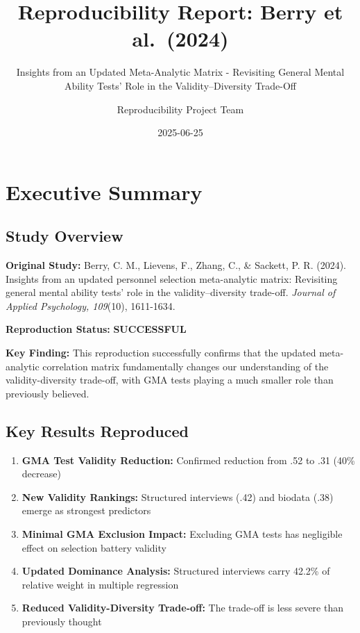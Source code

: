 \documentclass[
]{article}
\title{Reproducibility Report: Berry et al.~(2024)}
\subtitle{Insights from an Updated Meta-Analytic Matrix - Revisiting
General Mental Ability Tests' Role in the Validity--Diversity Trade-Off}
\author{Reproducibility Project Team}
\date{2025-06-25}
\providecommand{\tightlist}{%
  \setlength{\itemsep}{0pt}\setlength{\parskip}{0pt}}
\begin{document}
\maketitle

{
\setcounter{tocdepth}{2}
\tableofcontents
}
\section{Executive Summary}\label{executive-summary}

\subsection{Study Overview}\label{study-overview}

\textbf{Original Study:} Berry, C. M., Lievens, F., Zhang, C., \&
Sackett, P. R. (2024). Insights from an updated personnel selection
meta-analytic matrix: Revisiting general mental ability tests' role in
the validity--diversity trade-off. \emph{Journal of Applied Psychology,
109}(10), 1611-1634.

\textbf{Reproduction Status:} \textbf{SUCCESSFUL}

\textbf{Key Finding:} This reproduction successfully confirms that the
updated meta-analytic correlation matrix fundamentally changes our
understanding of the validity-diversity trade-off, with GMA tests
playing a much smaller role than previously believed.

\subsection{Key Results Reproduced}\label{key-results-reproduced}

\begin{enumerate}
\def\labelenumi{\arabic{enumi}.}
\tightlist
\item
  \textbf{GMA Test Validity Reduction:} Confirmed reduction from .52 to
  .31 (40\% decrease)
\item
  \textbf{New Validity Rankings:} Structured interviews (.42) and
  biodata (.38) emerge as strongest predictors
\item
  \textbf{Minimal GMA Exclusion Impact:} Excluding GMA tests has
  negligible effect on selection battery validity
\item
  \textbf{Updated Dominance Analysis:} Structured interviews carry
  42.2\% of relative weight in multiple regression
\item
  \textbf{Reduced Validity-Diversity Trade-off:} The trade-off is less
  severe than previously thought
\end{enumerate}
\end{document}
